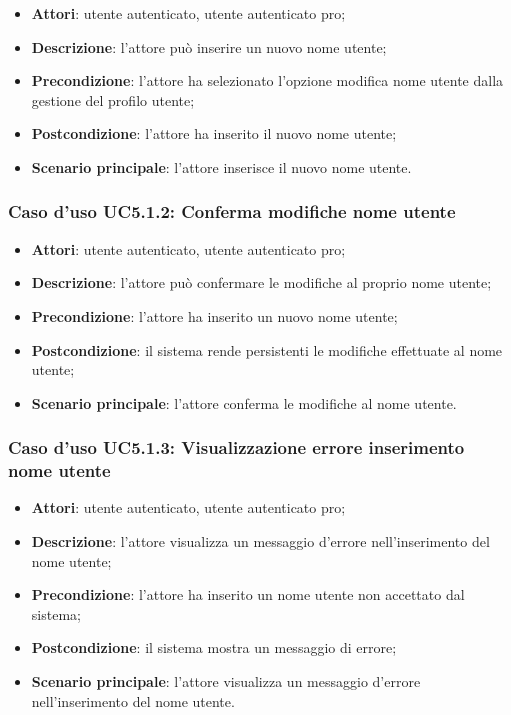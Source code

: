 \begin{itemize}
	\item \textbf{Attori}: utente autenticato, utente autenticato pro;
	\item \textbf{Descrizione}: l'attore può inserire un nuovo nome utente;
	\item \textbf{Precondizione}: l'attore ha selezionato l'opzione modifica nome utente dalla gestione del profilo utente;
	\item \textbf{Postcondizione}: l'attore ha inserito il nuovo nome utente;
	\item \textbf{Scenario principale}: l'attore inserisce il nuovo nome utente.
\end{itemize}

\subsubsection{Caso d'uso UC5.1.2: Conferma modifiche nome utente}

\begin{itemize}
	\item \textbf{Attori}: utente autenticato, utente autenticato pro;
	\item \textbf{Descrizione}: l'attore può confermare le modifiche al proprio nome utente;
	\item \textbf{Precondizione}: l'attore ha inserito un nuovo nome utente;
	\item \textbf{Postcondizione}: il sistema rende persistenti le modifiche effettuate al nome utente;
	\item \textbf{Scenario principale}: l'attore conferma le modifiche al nome utente.
\end{itemize}

\subsubsection{Caso d'uso UC5.1.3: Visualizzazione errore inserimento nome utente}
\begin{itemize}
	\item \textbf{Attori}: utente autenticato, utente autenticato pro;
	\item \textbf{Descrizione}: l'attore visualizza un messaggio d'errore nell'inserimento del nome utente;
	\item \textbf{Precondizione}: l'attore ha inserito un nome utente non accettato dal sistema;
	\item \textbf{Postcondizione}: il sistema mostra un messaggio di errore;
	\item \textbf{Scenario principale}: l'attore visualizza un messaggio d'errore nell'inserimento del nome utente.
\end{itemize}


